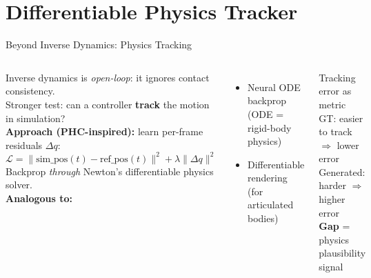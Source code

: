 \documentclass[aspectratio=169, 10pt]{beamer}
\begin{document}
\section{Differentiable Physics Tracker}

\begin{frame}{Beyond Inverse Dynamics: Physics Tracking}
  \begin{columns}[T]
      \small
      Inverse dynamics is \emph{open-loop}: it ignores contact consistency.\\
      Stronger test: can a controller \textbf{track} the motion in simulation?\\[0.4em]

      \textbf{Approach (PHC-inspired):} learn per-frame residuals $\Delta q$:
      \[
        \mathcal{L} = \|\text{sim\_pos}(t) - \text{ref\_pos}(t)\|^2 + \lambda \|\Delta q\|^2
      \]
      Backprop \emph{through} Newton's differentiable physics solver.\\[0.4em]

      \textbf{Analogous to:}
      \begin{itemize}\setlength\itemsep{0pt}
        \item Neural ODE backprop (ODE = rigid-body physics)
        \item Differentiable rendering (for articulated bodies)
      \end{itemize}

      \vspace{0.3em}
      \begin{exampleblock}{\small Tracking error as metric}
        \small GT: easier to track $\Rightarrow$ lower error\\
        Generated: harder $\Rightarrow$ higher error\\
        \textbf{Gap} = physics plausibility signal
      \end{exampleblock}

      \vspace{0.3em}
\end{columns}
\end{frame}
\end{document}
